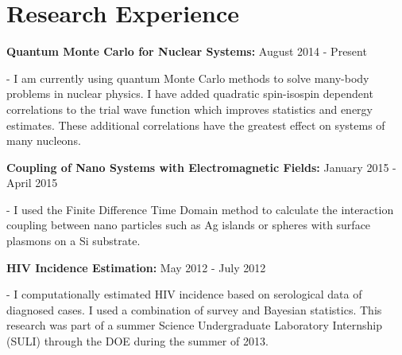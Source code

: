 \documentclass[letterpaper,10pt]{article}
\renewenvironment{itemize}{
  \begin{list}{}{
    \setlength{\leftmargin}{1.5em}
  }
}{
  \end{list}
}
\begin{document}
\section*{Research Experience}
\begin{itemize}


 \item \textbf{Quantum Monte Carlo for Nuclear Systems:} August 2014 - Present
  \begin{itemize}
     \item - I am currently using quantum Monte Carlo methods to solve many-body problems in nuclear physics. I have added quadratic spin-isospin dependent correlations to the trial wave function which improves statistics and energy estimates. These additional correlations have the greatest effect on systems of many nucleons.
   \end{itemize}

 \item \textbf{Coupling of Nano Systems with Electromagnetic Fields:} January 2015 - April 2015
  \begin{itemize}
     \item - I used the Finite Difference Time Domain method to calculate the interaction coupling between nano particles such as Ag islands or spheres with surface plasmons on a Si substrate. 
  \end{itemize}

 \item \textbf{HIV Incidence Estimation:} May 2012 - July 2012
  \begin{itemize}
     \item - I computationally estimated HIV incidence based on serological data of diagnosed cases. I used a combination of survey and Bayesian statistics. This research was part of a summer Science Undergraduate Laboratory Internship (SULI) through the DOE during the summer of 2013.
   \end{itemize}


\end{itemize}
\end{document}
